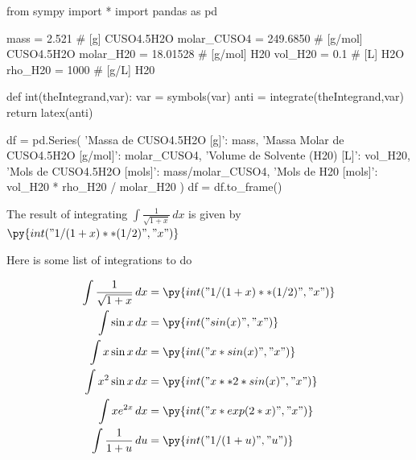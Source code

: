 \documentclass[a4paper, 11pt]{article}
\begin{document}
        \begin{pycode}
            from sympy import *
            import pandas as pd

            mass = 2.521 # [g] CUSO4.5H2O
            molar_CUSO4 = 249.6850 # [g/mol] CUSO4.5H2O
            molar_H20 = 18.01528 # [g/mol] H20
            vol_H20 = 0.1 # [L] H2O
            rho_H20 = 1000 # [g/L] H20

            def int(theIntegrand,var):
                var  = symbols(var)
                anti = integrate(theIntegrand,var)
                return latex(anti)

            df = pd.Series({
                'Massa de CUSO4.5H2O [g]': mass,
                'Massa Molar de CUSO4.5H2O [g/mol]': molar_CUSO4,
                'Volume de Solvente (H20) [L]': vol_H20,
                'Mols de CUSO4.5H2O [mols]': mass/molar_CUSO4,
                'Mols de H20 [mols]': vol_H20 * rho_H20 / molar_H20
            })
            df = df.to_frame()




        \end{pycode}
        The result of integrating $\int \frac{1}{\sqrt{ 1+x }} \, dx$ is given by $\py{int("1/(1+x)**(1/2)","x")}$

            Here is some list of integrations to do

            \begin{align*}
            \int \frac{1}{\sqrt{ 1+x }} \, dx &=  \py{int("1/(1+x)**(1/2)","x")} \\
            \int \sin x \, dx &=  \py{int("sin(x)","x")} \\
            \int x \sin x \, dx &=  \py{int("x*sin(x)","x")} \\
            \int x^2 \sin x \, dx &=  \py{int("x**2 * sin(x)","x")} \\
            \int x e^{2 x} \, dx &=  \py{int("x*exp(2*x)","x")} \\
            \int \frac{1}{1+u} \, du &=  \py{int("1/(1+u)","u")} \\
            \end{align*}
\end{document}
